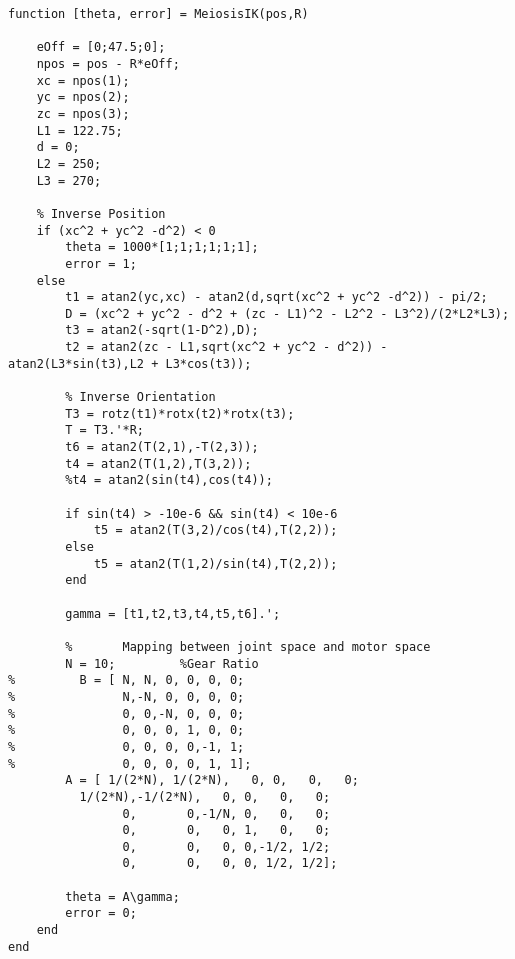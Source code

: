 \begin{lstlisting}[frame=lines,style=Matlab-editor,basicstyle = \mlttfamily, caption=Inverse Kinematics MATLAB Function]
function [theta, error] = MeiosisIK(pos,R)

    eOff = [0;47.5;0];
    npos = pos - R*eOff;
    xc = npos(1);
    yc = npos(2);
    zc = npos(3);
    L1 = 122.75;
    d = 0;
    L2 = 250;
    L3 = 270;

    % Inverse Position
    if (xc^2 + yc^2 -d^2) < 0
        theta = 1000*[1;1;1;1;1;1];
        error = 1;
    else
        t1 = atan2(yc,xc) - atan2(d,sqrt(xc^2 + yc^2 -d^2)) - pi/2;
        D = (xc^2 + yc^2 - d^2 + (zc - L1)^2 - L2^2 - L3^2)/(2*L2*L3);
        t3 = atan2(-sqrt(1-D^2),D);
        t2 = atan2(zc - L1,sqrt(xc^2 + yc^2 - d^2)) - atan2(L3*sin(t3),L2 + L3*cos(t3));

        % Inverse Orientation
        T3 = rotz(t1)*rotx(t2)*rotx(t3);
        T = T3.'*R;
        t6 = atan2(T(2,1),-T(2,3));
        t4 = atan2(T(1,2),T(3,2));
        %t4 = atan2(sin(t4),cos(t4));

        if sin(t4) > -10e-6 && sin(t4) < 10e-6
            t5 = atan2(T(3,2)/cos(t4),T(2,2));
        else
            t5 = atan2(T(1,2)/sin(t4),T(2,2));
        end

        gamma = [t1,t2,t3,t4,t5,t6].';

        %       Mapping between joint space and motor space
        N = 10;         %Gear Ratio
%         B = [ N, N, 0, 0, 0, 0;
%               N,-N, 0, 0, 0, 0;
%               0, 0,-N, 0, 0, 0;
%               0, 0, 0, 1, 0, 0;
%               0, 0, 0, 0,-1, 1;
%               0, 0, 0, 0, 1, 1];
        A = [ 1/(2*N), 1/(2*N),   0, 0,   0,   0;
          1/(2*N),-1/(2*N),   0, 0,   0,   0;
                0,       0,-1/N, 0,   0,   0;
                0,       0,   0, 1,   0,   0;
                0,       0,   0, 0,-1/2, 1/2;
                0,       0,   0, 0, 1/2, 1/2];

        theta = A\gamma;
        error = 0;
    end
end
\end{lstlisting}
